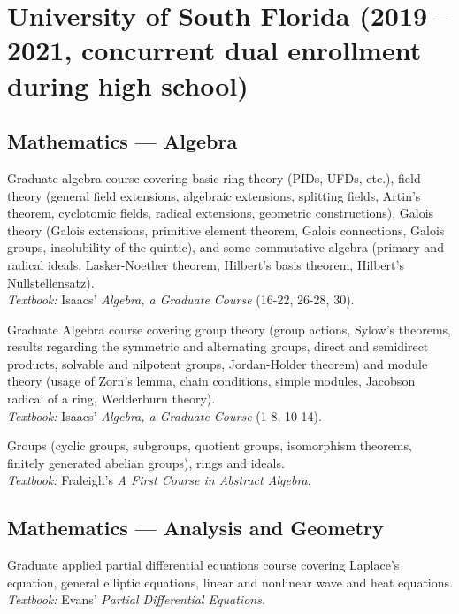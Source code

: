 \documentclass[11pt,letterpaper,sans]{moderncv}
\begin{document}
\section{University of South Florida (2019 -- 2021, concurrent dual enrollment during high school)}


\subsection{Mathematics --- Algebra}

%
  {Graduate algebra course covering basic ring theory (PIDs, UFDs, etc.), field theory (general field extensions, algebraic extensions, splitting fields, Artin's theorem, cyclotomic fields, radical extensions, geometric constructions), Galois theory (Galois extensions, primitive element theorem, Galois connections, Galois groups, insolubility of the quintic), and some commutative algebra (primary and radical ideals, Lasker-Noether theorem, Hilbert's basis theorem, Hilbert's Nullstellensatz).  \\ \emph{Textbook: }Isaacs' \emph{Algebra, a Graduate Course} (16-22, 26-28, 30).}

%
  {Graduate Algebra course covering group theory (group actions, Sylow's theorems, results regarding the symmetric and alternating groups, direct and semidirect products, solvable and nilpotent groups, Jordan-Holder theorem) and module theory (usage of Zorn's lemma, chain conditions, simple modules, Jacobson radical of a ring, Wedderburn theory). \\ \emph{Textbook: }Isaacs' \emph{Algebra, a Graduate Course} (1-8, 10-14).}

%
  {Groups (cyclic groups, subgroups, quotient groups, isomorphism theorems, finitely generated abelian groups), rings and ideals. \\ \emph{Textbook: }Fraleigh's \emph{A First Course in Abstract Algebra}.}



\subsection{Mathematics --- Analysis and Geometry}

%
  {Graduate applied partial differential equations course covering Laplace's equation, general elliptic equations, linear and nonlinear wave and heat equations. \\ \emph{Textbook: }Evans' \emph{Partial Differential Equations}.}
\end{document}
